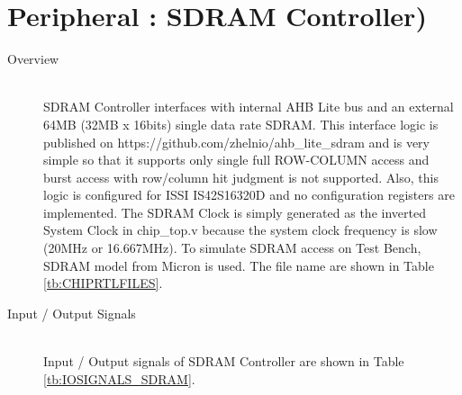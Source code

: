 \section{Peripheral : SDRAM Controller)}

\begin{description}

    \item[Overview]\mbox{}\\
         SDRAM Controller interfaces with internal AHB Lite bus and an external 64MB (32MB x 16bits) single data rate SDRAM. This interface logic is published on https://github.com/zhelnio/ahb\_lite\_sdram and is very simple so that it supports only single full ROW-COLUMN access and burst access with row/column hit judgment is not supported. Also, this logic is configured for ISSI IS42S16320D and no configuration registers are implemented. The SDRAM Clock is simply generated as the inverted System Clock in chip\_top.v because the system clock frequency is slow (20MHz or 16.667MHz).
To simulate SDRAM access on Test Bench, SDRAM model from Micron is used. The file name are shown in Table \ref{tb:CHIPRTLFILES}.
        
    \item[Input / Output Signals]\mbox{}\\
        Input / Output signals of SDRAM Controller are shown in Table \ref{tb:IOSIGNALS_SDRAM}.
 
\end{description}

